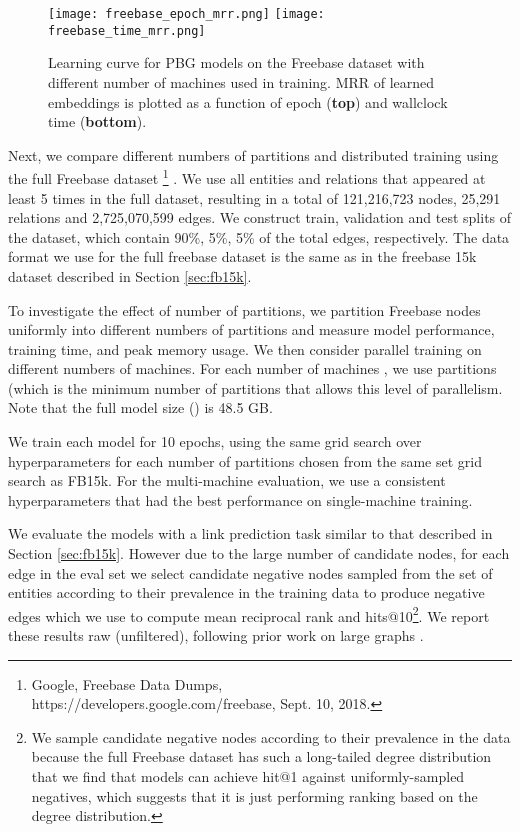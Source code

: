 \documentclass{article}
\begin{document}
\begin{figure*}[h!]
\centering
    \texttt{[image: freebase\_epoch\_mrr.png]}
    \texttt{[image: freebase\_time\_mrr.png]}
    \vspace{-3mm}
    \caption{Learning curve for PBG models on the Freebase dataset with different number of machines used in training. MRR of learned embeddings is plotted as a function of epoch (\textbf{top}) and wallclock time (\textbf{bottom}).}
    \vspace{-3mm}
    \label{fig:freebase}
\end{figure*}

\label{sec:fbfull}
Next, we compare different numbers of partitions and distributed training using the full Freebase dataset \footnote{Google, Freebase Data Dumps, \\ https://developers.google.com/freebase, Sept. 10, 2018.} \cite{freebase:datadumps}. We use all entities and relations that appeared at least 5 times in the full dataset, resulting in a total of 121,216,723 nodes, 25,291 relations and 2,725,070,599 edges. We construct train, validation and test splits of the dataset, which contain 90\%, 5\%, 5\% of the total edges, respectively. The data format we use for the full freebase dataset is the same as in the freebase 15k dataset described in Section \ref{sec:fb15k}.

To investigate the effect of number of partitions, we partition Freebase nodes uniformly into different numbers of partitions and measure model performance, training time, and peak memory usage.  We then consider parallel training on different numbers of machines. For each number of machines , we use  partitions (which is the minimum number of partitions that allows this level of parallelism. Note that the full model size () is 48.5 GB.

We train each model for 10 epochs, using the same grid search over hyperparameters for each number of partitions chosen from the same set grid search as FB15k. For the multi-machine evaluation, we use a consistent hyperparameters that had the best performance on single-machine training.

We evaluate the models with a link prediction task similar to that described in Section \ref{sec:fb15k}. However due to the large number of candidate nodes, for each edge in the eval set we select  candidate negative nodes sampled from the set of entities according to their prevalence in the training data to produce negative edges which we use to compute mean reciprocal rank and hits@10\footnote{We sample candidate negative nodes according to their prevalence in the data because the full Freebase dataset has such a long-tailed degree distribution that we find that models can achieve  hit@1 against  uniformly-sampled negatives, which suggests that it is just performing ranking based on the degree distribution.}.
We report these results raw (unfiltered), following prior work on large graphs \cite{transE}. 
\end{document}
